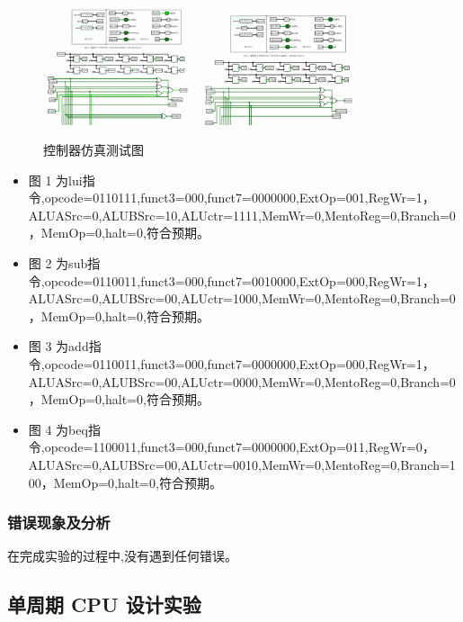 \documentclass{article}
\begin{document}
    \begin{figure}[H]
    \centering
    \includegraphics[width=0.4\textwidth]{1.5.3.png}  
    \includegraphics[width=0.4\textwidth]{1.5.4.png}
    \caption{控制器仿真测试图}
    \end{figure}
    
    \begin{itemize}
        \item 图 1 为lui指令,opcode=0110111,funct3=000,funct7=0000000,ExtOp=001,RegWr=1，ALUASrc=0,ALUBSrc=10,ALUctr=1111,MemWr=0,MentoReg=0,Branch=0，MemOp=0,halt=0,符合预期。
        \item 图 2 为sub指令,opcode=0110011,funct3=000,funct7=0010000,ExtOp=000,RegWr=1，ALUASrc=0,ALUBSrc=00,ALUctr=1000,MemWr=0,MentoReg=0,Branch=0，MemOp=0,halt=0,符合预期。
        \item 图 3 为add指令,opcode=0110011,funct3=000,funct7=0000000,ExtOp=000,RegWr=1，ALUASrc=0,ALUBSrc=00,ALUctr=0000,MemWr=0,MentoReg=0,Branch=0，MemOp=0,halt=0,符合预期。
        \item 图 4 为beq指令,opcode=1100011,funct3=000,funct7=0000000,ExtOp=011,RegWr=0，ALUASrc=0,ALUBSrc=00,ALUctr=0010,MemWr=0,MentoReg=0,Branch=100，MemOp=0,halt=0,符合预期。
    \end{itemize}
    
    

    \subsubsection{错误现象及分析}
    在完成实验的过程中,没有遇到任何错误。

    \subsection{单周期 CPU 设计实验}
\end{document}
